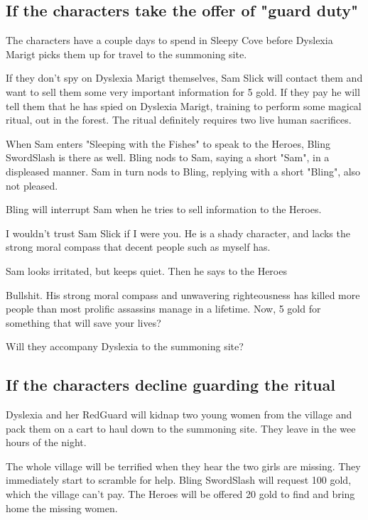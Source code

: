 \subsection*{If the characters take the offer of "guard duty"}
The characters have a couple days to spend in Sleepy Cove before Dyslexia Marigt picks them up for travel to the summoning site.

If they don't spy on Dyslexia Marigt themselves, Sam Slick will contact them and want to sell them some very important information for 5 gold. If they pay he will tell them that he has spied on Dyslexia Marigt, training to perform some magical ritual, out in the forest. The ritual definitely requires two live human sacrifices.

When Sam enters "Sleeping with the Fishes" to speak to the Heroes, Bling SwordSlash is there as well. Bling nods to Sam, saying a short "Sam", in a displeased manner. Sam in turn nods to Bling, replying with a short "Bling", also not pleased.

Bling will interrupt Sam when he tries to sell information to the Heroes.
\begin{readoutloud}
I wouldn't trust Sam Slick if I were you. He is a shady character, and lacks the strong moral compass that decent people such as myself has.
\end{readoutloud}
Sam looks irritated, but keeps quiet. Then he says to the Heroes
\begin{readoutloud}
Bullshit. His strong moral compass and unwavering righteousness has killed more people than most prolific assassins manage in a lifetime. Now, 5 gold for something that will save your lives?
\end{readoutloud}

Will they accompany Dyslexia to the summoning site?


\subsection*{If the characters decline guarding the ritual}
Dyslexia and her RedGuard will kidnap two young women from the village and pack them on a cart to haul down to the summoning site. They leave in the wee hours of the night.

The whole village will be terrified when they hear the two girls are missing. They immediately start to scramble for help. Bling SwordSlash will request 100 gold, which the village can't pay. The Heroes will be offered 20 gold to find and bring home the missing women.

